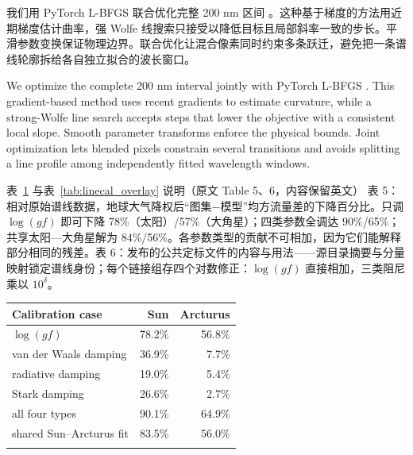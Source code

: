 我们用 PyTorch L-BFGS 联合优化完整 200 nm 区间 \citep{NocedalWright2006}。这种基于梯度的方法用近期梯度估计曲率，强 Wolfe 线搜索只接受以降低目标且局部斜率一致的步长。平滑参数变换保证物理边界。联合优化让混合像素同时约束多条跃迁，避免把一条谱线轮廓拆给各自独立拟合的波长窗口。

\begin{EN}
We optimize the complete 200 nm interval jointly with PyTorch L-BFGS
\citep{NocedalWright2006}. This gradient-based method uses recent gradients to estimate
curvature, while a strong-Wolfe line search accepts steps that lower the
objective with a consistent local slope. Smooth parameter transforms enforce
the physical bounds. Joint optimization lets blended pixels constrain several
transitions and avoids splitting a line profile among independently fitted
wavelength windows.
\end{EN}

\begin{notebox}{表~\ref{tab:linecal_ablation} 与表~\ref{tab:linecal_overlay} 说明（原文 Table 5、6，内容保留英文）}
表 5：相对原始谱线数据，地球大气降权后“图集−模型”均方流量差的下降百分比。只调 $\log(gf)$ 即可下降 78\%（太阳）/57\%（大角星）；四类参数全调达 90\%/65\%；共享太阳—大角星解为 84\%/56\%。各参数类型的贡献不可相加，因为它们能解释部分相同的残差。表 6：发布的公共定标文件的内容与用法——源目录摘要与分量映射锁定谱线身份；每个链接组存四个对数修正：$\log(gf)$ 直接相加，三类阻尼乘以 $10^{\delta}$。
\end{notebox}

\begin{table}[t]
\centering
{}
\label{tab:linecal_ablation}
\begingroup
\setlength{\tabcolsep}{6pt}
\renewcommand{\arraystretch}{1.12}
\footnotesize
\begin{tabular}{@{}lrr@{}}
\toprule
\textbf{Calibration case} & \textbf{Sun} & \textbf{Arcturus} \\
\midrule
$\log(gf)$ & 78.2\% & 56.8\% \\
van der Waals damping & 36.9\% & 7.7\% \\
radiative damping & 19.0\% & 5.4\% \\
Stark damping & 26.6\% & 2.7\% \\
all four types & 90.1\% & 64.9\% \\
\midrule
shared Sun--Arcturus fit & 83.5\% & 56.0\% \\
\addlinespace[2pt]
\bottomrule
\end{tabular}
\endgroup
\end{table}

